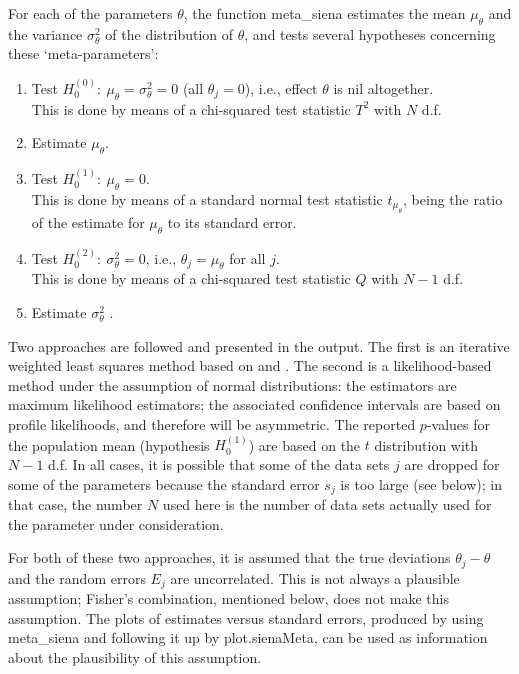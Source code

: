 \documentclass[a4paper,fleqn,11pt]{article}
\newcommand{\+}{\, + \,}
\begin{document}
For each of the parameters $\theta$, the function \textsf{meta\_siena}
estimates the mean $\mu_\theta$
and the variance $\sigma^2_\theta$ of the distribution of $\theta$,
and tests several hypotheses concerning these `meta-parameters':
\begin{enumerate}
\item Test $H_0^{(0)}:\ \mu_\theta = \sigma^2_\theta = 0$
                       (all $\theta_j = 0$),
                      i.e., effect $\theta$ is nil altogether.\\
      This is done by means of a chi-squared test statistic $T^2$
      with $N$ d.f.
\item Estimate  $\mu_\theta $.
\item Test $H_0^{(1)}:\ \mu_\theta = 0$.\\
      This is done by means of a standard normal test statistic
      $ t_{\mu_\theta}$,
      being the ratio of the estimate for $\mu_\theta $
      to its standard error.
\item Test $H_0^{(2)}:\ \sigma^2_\theta = 0$,
                     i.e., $\theta_j = \mu_\theta$ for all $j$. \\
      This is done by means of a chi-squared test statistic $Q$
      with $N-1$ d.f.
\item Estimate  $\sigma^2_\theta$ .
\end{enumerate}
Two approaches are followed and presented in the output.
The first is an iterative weighted least squares method based on
\citet{Cochran54} and \citet{SnijdersBaerveldt03}.
The second is a likelihood-based method under the assumption
of normal distributions: the estimators are maximum likelihood
estimators; the associated confidence intervals
are based on profile likelihoods, and therefore will be
asymmetric. The reported
$p$-values for the population mean (hypothesis $H_0^{(1)}$)
are based on the $t$ distribution with $N-1$ d.f.
In all cases, it is possible that some of the data sets $j$ are
dropped for some of the parameters because the standard error $s_j$
is too large (see below);
in that case, the number $N$ used here
is the number of data sets actually used for the
parameter under consideration.

For both of these two approaches,
it is assumed that the true deviations $\theta_j - \theta$
and the random errors $E_j$ are uncorrelated.
This is not always a plausible assumption; Fisher's combination,
mentioned below, does not make this assumption.
The plots of estimates versus standard errors, produced
by using \textsf{meta\_siena} and following it up by
\textsf{plot.sienaMeta}, can be used as information about the
plausibility of this assumption.
\end{document}
